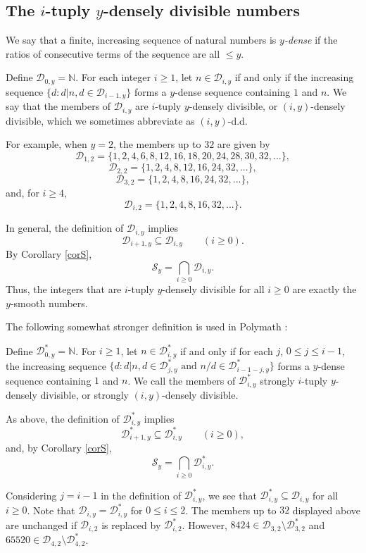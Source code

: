 \documentclass[11pt]{amsart}
\begin{document}
\subsection{The $i$-tuply $y$-densely divisible numbers}

We say that a finite, increasing sequence of natural numbers is \emph{$y$-dense} if the ratios of consecutive terms of the sequence are all $\le y$. 

Define $\mathcal{D}_{0,y}=\mathbb{N}$. For each integer $i\ge 1$, let $n\in \mathcal{D}_{i,y}$ if and only if the increasing sequence $\{d: d|n, d\in \mathcal{D}_{i-1,y}\}$ forms a $y$-dense sequence containing $1$ and $n$. We say that the members of  $\mathcal{D}_{i,y}$ are $i$-tuply $y$-densely divisible, or $(i,y)$-densely divisible, which we sometimes abbreviate as $(i,y)$-d.d.

For example, when $y=2$, the members up to $32$ are given by
$$
\mathcal{D}_{1,2}=\{ 1, 2, 4, 6, 8, 12, 16, 18, 20, 24, 28, 30, 32, ... \},
$$
$$
\mathcal{D}_{2,2}=\{ 1, 2, 4, 8, 12, 16, 24, 32,...\},
$$
$$
\mathcal{D}_{3,2}=\{ 1, 2, 4, 8, 16, 24, 32,...\},
$$
and, for $i\ge 4$,
$$
\mathcal{D}_{i,2}=\{ 1, 2, 4, 8, 16, 32,...\}.
$$

In general, the definition of  $\mathcal{D}_{i,y}$ implies 
$$\mathcal{D}_{i+1,y}\subseteq \mathcal{D}_{i,y}\qquad (i\ge 0).$$ 
By Corollary \ref{corS},
$$
\mathcal{S}_y = \bigcap_{i\ge 0} \mathcal{D}_{i,y}.
$$
Thus, the integers that are $i$-tuply $y$-densely divisible for all $i\ge 0$ are exactly the $y$-smooth numbers.

The following somewhat stronger definition is used in Polymath \cite{Poly}:

Define $\mathcal{D}^*_{0,y}=\mathbb{N}$. For $i\ge 1$, let $n\in \mathcal{D}^*_{i,y}$ if and only if for each $j$, $0\le j \le i-1$, 
the increasing sequence $\{d: d|n, d\in \mathcal{D}^*_{j,y} \text{ and } n/d \in \mathcal{D}^*_{i-1-j,y} \}$ forms a $y$-dense sequence containing $1$ and $n$. 
We call the members of  $\mathcal{D}^*_{i,y}$ strongly $i$-tuply $y$-densely divisible, or strongly $(i,y)$-densely divisible.

As above, the definition of  $\mathcal{D}^*_{i,y}$ implies
$$\mathcal{D}^*_{i+1,y}\subseteq \mathcal{D}^*_{i,y} \qquad (i\ge 0),$$
and, by Corollary \ref{corS},
$$
\mathcal{S}_y = \bigcap_{i\ge 0} \mathcal{D}^*_{i,y}.
$$

Considering $j=i-1$ in the definition of $\mathcal{D}^*_{i,y}$, we see that $\mathcal{D}^*_{i,y}\subseteq \mathcal{D}_{i,y}$ for all $i\ge 0$. 
Note that $\mathcal{D}_{i,y}=\mathcal{D}^*_{i,y}$ for $0\le i \le 2$. 
The members up to $32$ displayed above are unchanged if $\mathcal{D}_{i,2}$ is replaced by $\mathcal{D}^*_{i,2}$. 
However, $8424 \in \mathcal{D}_{3,2}\setminus \mathcal{D}^*_{3,2}$ and $65520 \in \mathcal{D}_{4,2}\setminus \mathcal{D}^*_{4,2}$. 
\end{document}
